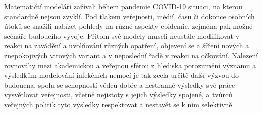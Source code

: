 Matematičtí modeláři zažívali během pandemie COVID-19 situaci, na kterou standardně nejsou zvyklí. Pod tlakem veřejnosti, médií, času či dokonce osobních útoků se snažili nabízet pohledy na různé aspekty epidemie, zejména pak možné scénáře budoucího vývoje. Přitom své modely museli neustále modifikovat v reakci na zavádění a uvolňování různých opatření, objevení se a šíření nových a znepokojivých virových variant a v neposlední řadě v reakci na očkování. Nalezení rovnováhy mezi akademickou a veřejnou sférou z hlediska porozumění významu a výsledkům modelování infekčních nemocí je tak zcela určitě další výzvou do budoucna, spolu se schopností vědců dobře a nestranně výsledky své práce vysvětlovat veřejnosti, včetně nejistoty s jejich výsledky spojené, a tvůrců veřejných politik tyto výsledky respektovat a nestavět se k nim selektivně.
